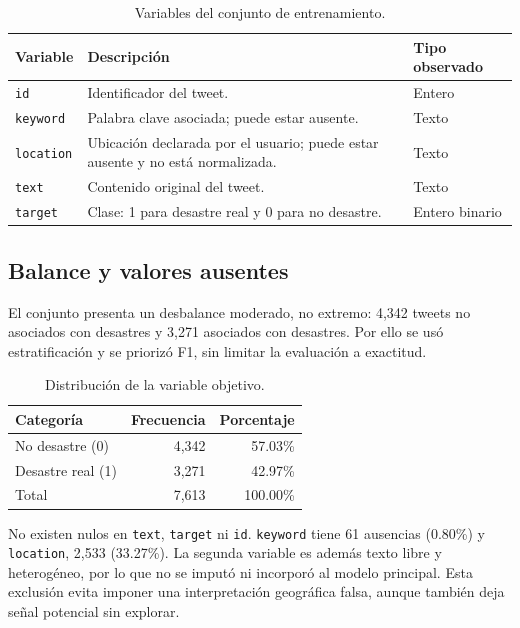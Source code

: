 \documentclass[11pt,letterpaper]{article}
\newcommand{\code}[1]{\texttt{#1}}
\begin{document}
\begin{table}[H]
\centering
\caption{Variables del conjunto de entrenamiento.}
\label{tab:variables}
\begin{tabularx}{\textwidth}{@{}lYl@{}}
\toprule
Variable & Descripción & Tipo observado \\
\midrule
\code{id} & Identificador del tweet. & Entero \\
\code{keyword} & Palabra clave asociada; puede estar ausente. & Texto \\
\code{location} & Ubicación declarada por el usuario; puede estar ausente y no está normalizada. & Texto \\
\code{text} & Contenido original del tweet. & Texto \\
\code{target} & Clase: 1 para desastre real y 0 para no desastre. & Entero binario \\
\bottomrule
\end{tabularx}
\end{table}

\subsection{Balance y valores ausentes}

El conjunto presenta un desbalance moderado, no extremo: 4,342 tweets no asociados con desastres y 3,271 asociados con desastres. Por ello se usó estratificación y se priorizó F1, sin limitar la evaluación a exactitud.

\begin{table}[H]
\centering
\caption{Distribución de la variable objetivo.}
\label{tab:balance}
\begin{tabular}{@{}lrr@{}}
\toprule
Categoría & Frecuencia & Porcentaje \\
\midrule
No desastre (0) & 4,342 & 57.03\% \\
Desastre real (1) & 3,271 & 42.97\% \\
\midrule
Total & 7,613 & 100.00\% \\
\bottomrule
\end{tabular}
\end{table}

No existen nulos en \code{text}, \code{target} ni \code{id}. \code{keyword} tiene 61 ausencias (0.80\%) y \code{location}, 2,533 (33.27\%). La segunda variable es además texto libre y heterogéneo, por lo que no se imputó ni incorporó al modelo principal. Esta exclusión evita imponer una interpretación geográfica falsa, aunque también deja señal potencial sin explorar.
\end{document}
